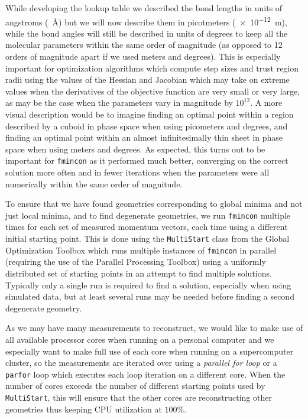 While developing the lookup table we described the bond lengths in units of angstroms (\SI{}{\angstrom}) but we will now describe them in picotmeters (\SI{e-12}{\m}), while the bond angles will still be described in units of degrees to keep all the molecular parameters within the same order of magnitude (as opposed to 12 orders of magnitude apart if we used meters and degrees). This is especially important for optimization algorithms which compute step sizes and trust region radii using the values of the Hessian and Jacobian which may take on extreme values when the derivatives of the objective function are very small or very large, as may be the case when the parameters vary in magnitude by $10^{12}$. A more visual description would be to imagine finding an optimal point within a region described by a cuboid in phase space when using picometers and degrees, and finding an optimal point within an almost infinitesimally thin sheet in phase space when using meters and degrees. As expected, this turns out to be important for \texttt{fmincon} as it performed much better, converging on the correct solution more often and in fewer iterations when the parameters were all numerically within the same order of magnitude.

To ensure that we have found geometries corresponding to global minima and not just local minima, and to find degenerate geometries, we run \texttt{fmincon} multiple times for each set of measured momentum vectors, each time using a different initial starting point. This is done using the \texttt{MultiStart} class from the Global Optimization Toolbox which runs multiple instances of \texttt{fmincon} in parallel (requiring the use of the Parallel Processing Toolbox) using a uniformly distributed set of starting points in an attempt to find multiple solutions. Typically only a single run is required to find a solution, especially when using simulated data, but at least several runs may be needed before finding a second degenerate geometry.

As we may have many measurements to reconstruct, we would like to make use of all available processor cores when running on a personal computer and we especially want to make full use of each core when running on a supercomputer cluster, so the measurements are iterated over using a \emph{parallel for loop} or a \texttt{parfor} loop which executes each loop iteration on a different core. When the number of cores exceeds the number of different starting points used by \texttt{MultiStart}, this will ensure that the other cores are reconstructing other geometries thus keeping CPU utilization at $100\%$.

